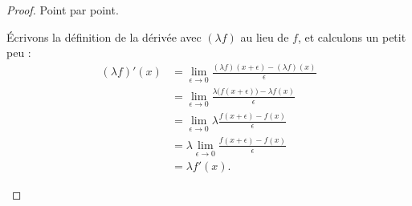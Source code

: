\begin{proof}
	Point par point.
	\begin{subproof}
		Écrivons la définition de la dérivée avec \( (\lambda f)\) au lieu de \( f\), et calculons un petit peu :
		\begin{subequations}
			\begin{align}
				(\lambda f)'(x) & =\lim_{\epsilon\to 0}\frac{ (\lambda f)(x+\epsilon)-(\lambda f)(x) }{ \epsilon }         \\
				                & =\lim_{\epsilon\to 0}\frac{ \lambda \big( f(x+\epsilon) \big)-\lambda f(x) }{ \epsilon } \\
				                & =\lim_{\epsilon\to 0}\lambda \frac{ f(x+\epsilon) -f(x) }{ \epsilon }                    \\
				                & =\lambda \lim_{\epsilon\to 0}\frac{ f(x+\epsilon) -f(x) }{ \epsilon }                    \\
				                & =\lambda f'(x).
			\end{align}
		\end{subequations}


\end{subproof}
\end{proof}
